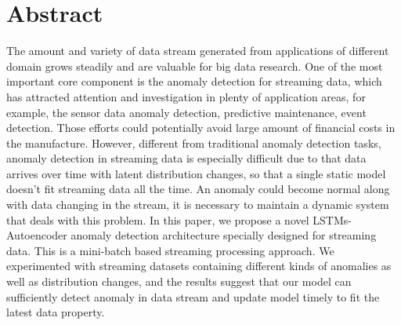 \chapter*{Abstract}
\label{chap:abstract}
The amount and variety of data stream generated from applications of different domain grows steadily and are valuable for big data research. One of the most important core component is the anomaly detection for streaming data, which has attracted attention and investigation in plenty of application areas, for example, the sensor data anomaly detection, predictive maintenance, event detection. Those efforts could potentially avoid large amount of financial costs in the manufacture. However, different from traditional anomaly detection tasks, anomaly detection in streaming data is especially difficult due to that data arrives over time with latent distribution changes, so that a single static model doesn’t fit streaming data all the time. An anomaly could become normal along with data changing in the stream, it is necessary to maintain a dynamic system that deals with this problem. In this paper, we propose a novel LSTMs-Autoencoder anomaly detection architecture specially designed for streaming data. This is a mini-batch based streaming processing approach. We experimented with streaming datasets containing different kinds of anomalies as well as distribution changes, and the results suggest that our model can sufficiently detect anomaly in data stream and update model timely to fit the latest data property.
